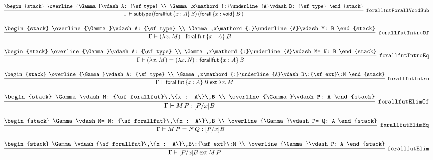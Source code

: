 \[
\infer[{\tt forallfutForallVoidSub}]{\Gamma \vdash {\sf subtype}\,({\sf forallfut}\,\{x : A\}\,B)\,({\sf forall}\,\{x : {\sf void}\}\,B')}{
\begin{stack}
\overline{\Gamma}\vdash A: {\sf type}
\\
\Gamma ,x\mathord{:}\underline{A}\vdash B: {\sf type}
\end{stack}}
\]

\[
\infer[{\tt forallfutIntroOf}]{\Gamma \vdash (\lambda x.\,M): {\sf forallfut}\,\{x : A\}\,B}{
\begin{stack}
\overline{\Gamma}\vdash A: {\sf type}
\\
\Gamma ,x\mathord{:}\underline{A}\vdash M: B
\end{stack}}
\]

\[
\infer[{\tt forallfutIntroEq}]{\Gamma \vdash (\lambda x.\,M)= (\lambda x.\,N): {\sf forallfut}\,\{x : A\}\,B}{
\begin{stack}
\overline{\Gamma}\vdash A: {\sf type}
\\
\Gamma ,x\mathord{:}\underline{A}\vdash M= N: B
\end{stack}}
\]

\[
\infer[{\tt forallfutIntro}]{\Gamma \vdash {\sf forallfut}\,\{x : A\}\,B\:{\sf ext}\:\lambda x.\,M}{
\begin{stack}
\overline{\Gamma}\vdash A: {\sf type}
\\
\Gamma ,x\mathord{:}\underline{A}\vdash B\:{\sf ext}\:M
\end{stack}}
\]

\[
\infer[{\tt forallfutElimOf}]{\Gamma \vdash M\,P: [P/x]B}{
\begin{stack}
\Gamma \vdash M: {\sf forallfut}\,\{x : A\}\,B
\\
\overline{\Gamma}\vdash P: A
\end{stack}}
\]

\[
\infer[{\tt forallfutElimEq}]{\Gamma \vdash M\,P= N\,Q: [P/x]B}{
\begin{stack}
\Gamma \vdash M= N: {\sf forallfut}\,\{x : A\}\,B
\\
\overline{\Gamma}\vdash P= Q: A
\end{stack}}
\]

\[
\infer[{\tt forallfutElim}]{\Gamma \vdash [P/x]B\:{\sf ext}\:M\,P}{
\begin{stack}
\Gamma \vdash {\sf forallfut}\,\{x : A\}\,B\:{\sf ext}\:M
\\
\overline{\Gamma}\vdash P: A
\end{stack}}
\]

